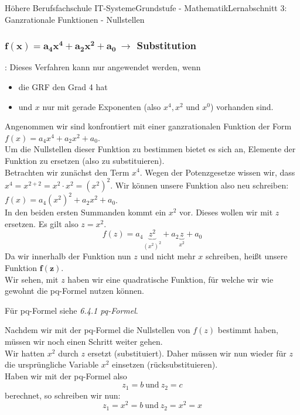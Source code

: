 \documentclass[11pt,twocolumn,oneside,openany,headings=optiontotoc,11pt,numbers=noenddot]{article}
\begin{document}
\begin{worksheet}{Höhere Berufsfachschule IT-Systeme}{Grundstufe - Mathematik}{Lernabschnitt 3: Ganzrationale Funktionen - Nullstellen}
		\subsubsection{\(\mathbf{f(x) = a_4x^4 + a_2x^2 + a_0}\ \rightarrow\) Substitution}
		\begin{framed}
			\noindent
			\underline{\color{red}{Vorsicht!}}: Dieses Verfahren kann nur angewendet werden, wenn
			\begin{itemize}
				\item die GRF den Grad 4 hat
				\item und \(x\) nur mit gerade Exponenten (also \(x^4, x^2\) und \(x^0\)) vorhanden sind.
			\end{itemize}
		\end{framed}
		Angenommen wir sind konfrontiert mit einer ganzrationalen Funktion der Form \(f(x) = a_4x^4 + a_2x^2 + a_0\).\\
		Um die Nullstellen dieser Funktion zu bestimmen bietet es sich an, Elemente der Funktion \grq{}zu ersetzen\grq{} (also zu substituieren).\\
		Betrachten wir zunächst den Term \(x^4\). Wegen der Potenzgesetze wissen wir, dass \(x^4 = x^{2+2} = x^2\cdot{}x^2 = (x^2)^2\). Wir können unsere Funktion also neu schreiben: \(f(x) = a_4(x^2)^2 + a_2x^2 + a_0\).\\
		In den beiden ersten Summanden kommt ein \(x^2\) vor. Dieses wollen wir mit \(z\) ersetzen. Es gilt also \(z = x^2\).\\
		\[f(z) = a_4\underbrace{z^2}_{(x^2)^2} + a_2\underbrace{z}_{x^2} + a_0\]
		Da wir innerhalb der Funktion nun \(z\) und nicht mehr \(x\) schreiben, heißt unsere Funktion \(\mathbf{f(z)}\).\\
		Wir sehen, mit \(z\) haben wir eine quadratische Funktion, für welche wir wie gewohnt die pq-Formel nutzen können.\\
		\par\noindent
		\small{Für pq-Formel siehe \textit{6.4.1 pq-Formel}.}\normalsize\\
		\par\noindent
		Nachdem wir mit der pq-Formel die Nullstellen von \(f(z)\) bestimmt haben, müssen wir noch einen Schritt weiter gehen.\\
		Wir hatten \(x^2\) durch \(z\) ersetzt (substituiert). Daher müssen wir nun wieder für \(z\) die ursprüngliche Variable \(x^2\) einsetzen (rücksubstituieren).\\
		Haben wir mit der pq-Formel also \[z_1 = b\ \text{und}\ z_2 = c\] berechnet, so schreiben wir nun: \[z_1 = x^2 = b\ \text{und}\ z_2 = x^2 = x\]

\end{worksheet}
\end{document}

